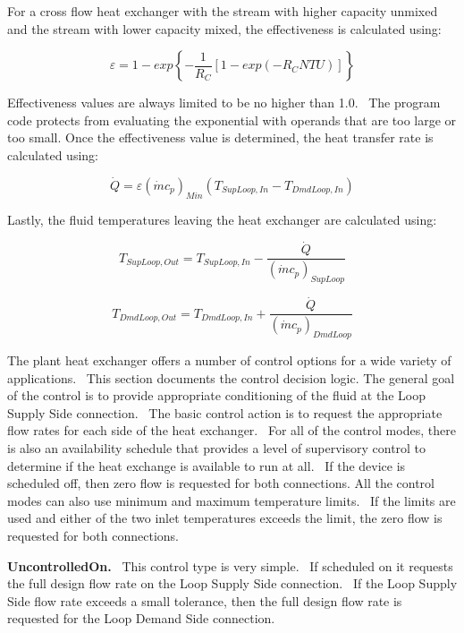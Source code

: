 For a cross flow heat exchanger with the stream with higher capacity unmixed and the stream with lower capacity mixed, the effectiveness is calculated using:

\begin{equation}
\varepsilon  = 1 - exp\left\{ { - \frac{1}{{{R_C}}}\left[ {1 - exp\left( { - {R_C}NTU} \right)} \right]} \right\}
\end{equation}

Effectiveness values are always limited to be no higher than 1.0.~ The program code protects from evaluating the exponential with operands that are too large or too small. Once the effectiveness value is determined, the heat transfer rate is calculated using:

\begin{equation}
\dot Q = \varepsilon {\left( {\dot m{c_p}} \right)_{Min}}\left( {{T_{SupLoop,In}} - {T_{DmdLoop,In}}} \right)
\end{equation}

Lastly, the fluid temperatures leaving the heat exchanger are calculated using:

\begin{equation}
{T_{SupLoop,Out}} = {T_{SupLoop,In}} - \frac{{\dot Q}}{{{{\left( {\dot m{c_p}} \right)}_{SupLoop}}}}
\end{equation}

\begin{equation}
{T_{DmdLoop,Out}} = {T_{DmdLoop,In}} + \frac{{\dot Q}}{{{{\left( {\dot m{c_p}} \right)}_{DmdLoop}}}}
\end{equation}

The plant heat exchanger offers a number of control options for a wide variety of applications.~ This section documents the control decision logic. The general goal of the control is to provide appropriate conditioning of the fluid at the Loop Supply Side connection. ~The basic control action is to request the appropriate flow rates for each side of the heat exchanger.~ For all of the control modes, there is also an availability schedule that provides a level of supervisory control to determine if the heat exchange is available to run at all.~ If the device is scheduled off, then zero flow is requested for both connections. All the control modes can also use minimum and maximum temperature limits.~ If the limits are used and either of the two inlet temperatures exceeds the limit, the zero flow is requested for both connections.

\textbf{UncontrolledOn.}~ This control type is very simple.~ If scheduled on it requests the full design flow rate on the Loop Supply Side connection.~ If the Loop Supply Side flow rate exceeds a small tolerance, then the full design flow rate is requested for the Loop Demand Side connection.

